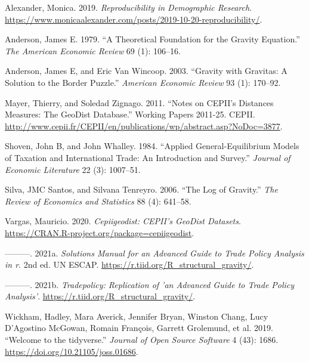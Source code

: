 \documentclass[12pt,reqno,oneside,pdftex]{formato-puc/puctesis} %
\newenvironment{CSLReferences}
  {}
  {\par}
\begin{document}
\hypertarget{refs}{}
\begin{CSLReferences}{1}{0}
\leavevmode\hypertarget{ref-malexander19}{}%
Alexander, Monica. 2019. \emph{Reproducibility in Demographic Research}.
\url{https://www.monicaalexander.com/posts/2019-10-20-reproducibility/}.

\leavevmode\hypertarget{ref-anderson1979theoretical}{}%
Anderson, James E. 1979. {``A Theoretical Foundation for the Gravity
Equation.''} \emph{The American Economic Review} 69 (1): 106--16.

\leavevmode\hypertarget{ref-anderson2003gravity}{}%
Anderson, James E, and Eric Van Wincoop. 2003. {``Gravity with Gravitas:
A Solution to the Border Puzzle.''} \emph{American Economic Review} 93
(1): 170--92.

\leavevmode\hypertarget{ref-CEPII201125}{}%
Mayer, Thierry, and Soledad Zignago. 2011. {``Notes on CEPII's Distances
Measures: The GeoDist Database.''} Working Papers 2011-25. CEPII.
\url{http://www.cepii.fr/CEPII/en/publications/wp/abstract.asp?NoDoc=3877}.

\leavevmode\hypertarget{ref-shoven1984applied}{}%
Shoven, John B, and John Whalley. 1984. {``Applied General-Equilibrium
Models of Taxation and International Trade: An Introduction and
Survey.''} \emph{Journal of Economic Literature} 22 (3): 1007--51.

\leavevmode\hypertarget{ref-silva2006log}{}%
Silva, JMC Santos, and Silvana Tenreyro. 2006. {``The Log of Gravity.''}
\emph{The Review of Economics and Statistics} 88 (4): 641--58.

\leavevmode\hypertarget{ref-cepiigeodist}{}%
Vargas, Mauricio. 2020. \emph{Cepiigeodist: CEPII's GeoDist Datasets}.
\url{https://CRAN.R-project.org/package=cepiigeodist}.

\leavevmode\hypertarget{ref-solutionsagtpa}{}%
---------. 2021a. \emph{Solutions Manual for an Advanced Guide to Trade
Policy Analysis in r}. 2nd ed. UN ESCAP.
\url{https://r.tiid.org/R_structural_gravity/}.

\leavevmode\hypertarget{ref-tradepolicy}{}%
---------. 2021b. \emph{Tradepolicy: Replication of 'an Advanced Guide
to Trade Policy Analysis'}.
\url{https://r.tiid.org/R_structural_gravity/}.

\leavevmode\hypertarget{ref-tidyverse}{}%
Wickham, Hadley, Mara Averick, Jennifer Bryan, Winston Chang, Lucy
D'Agostino McGowan, Romain François, Garrett Grolemund, et al. 2019.
{``Welcome to the {tidyverse}.''} \emph{Journal of Open Source Software}
4 (43): 1686. \url{https://doi.org/10.21105/joss.01686}.


\end{CSLReferences}
\end{document}
